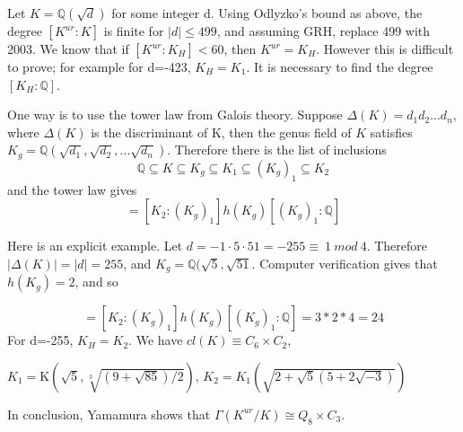 \documentclass[12pt]{extarticle}
\newcommand{\murgg}{\Gamma(K^{ur}/K)}
\newcommand{\Q}{\mathbb{Q}}
\newcommand{\<}{\langle}
\renewcommand{\>}{\rangle}
\theoremstyle{definition}
\begin{document}
Let $K=\Q(\sqrt{d})$ for some integer d. Using Odlyzko's bound as above, the degree $[K^{ur}:K]$ is finite for $|d|\leq 499$, and assuming GRH, replace 499 with 2003. We know that if $[K^{ur}:K_H]<60$, then $K^{ur}=K_H$. However this is difficult to prove; for example for d=-423, $K_H=K_1$. It is necessary to find the degree $[K_H:\Q]$. \par 
One way is to use the tower law from Galois theory. Suppose $\Delta(K)=d_1d_2...d_n$, where $\Delta(K)$ is the discriminant of K, then the genus field of $K$ satisfies $K_g=\Q(\sqrt{d_1},\sqrt{d_2},...\sqrt{d_n})$. Therefore there is the list of inclusions \begin{equation}
    \Q \subseteq K \subseteq K_g \subseteq K_1 \subseteq (K_g)_1 \subseteq K_2
\end{equation} and the tower law gives \begin{equation}
    [K_2:q] = [K_2:(K_g)_1]h(K_g)[(K_g)_1:\Q]
\end{equation}\par
Here is an explicit example. Let  $d=-1 \cdot 5 \cdot 51=-255\equiv \: 1\:mod\:4$. Therefore $|\Delta(K)|=|d|=255$, and $K_g = \Q(\sqrt{5},\sqrt{51}$. Computer verification gives that $h(K_g)=2$, and so 

\begin{equation}
     [K_2:\Q] = [K_2:(K_g)_1]h(K_g)[(K_g)_1:\Q]= 3*2*4=24
\end{equation}
For d=-255, $K_H=K_2$. We have $cl(K)\equiv C_6 \times C_2$, 

$K_1 = $K$ \left( 
\sqrt{5}, \sqrt[3]{(9+\sqrt{85})/2}
\right)$, $K_2 = K_1 \left( 
\sqrt{2+\sqrt{5}(5+2\sqrt{-3})}
\right)$

 In conclusion, Yamamura shows that $\murgg \cong Q_8 \times C_3$.
\end{document}
